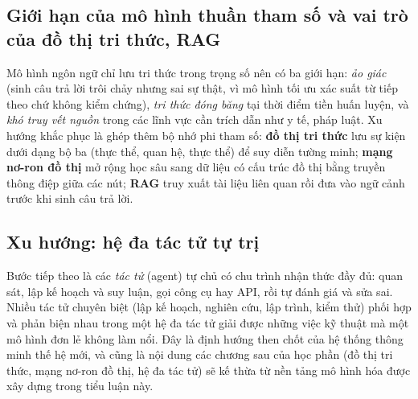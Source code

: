 
\subsection{Giới hạn của mô hình thuần tham số và vai trò của đồ thị tri thức, RAG}

Mô hình ngôn ngữ chỉ lưu tri thức trong trọng số nên có ba giới hạn: \emph{ảo giác} (sinh câu trả lời trôi chảy nhưng
sai sự thật, vì mô hình tối ưu xác suất từ tiếp theo chứ không kiểm chứng), \emph{tri thức đóng băng} tại thời điểm
tiền huấn luyện, và \emph{khó truy vết nguồn} trong các lĩnh vực cần trích dẫn như y tế, pháp luật. Xu hướng khắc phục
là ghép thêm bộ nhớ phi tham số: \textbf{đồ thị tri thức} lưu sự kiện dưới dạng bộ ba (thực thể, quan hệ, thực thể) để
suy diễn tường minh; \textbf{mạng nơ-ron đồ thị} mở rộng học sâu sang dữ liệu có cấu trúc đồ thị bằng truyền thông điệp
giữa các nút; \textbf{RAG} \cite{lewis2020} truy xuất tài liệu liên quan rồi đưa vào ngữ cảnh trước khi sinh câu trả lời.

\subsection{Xu hướng: hệ đa tác tử tự trị}

Bước tiếp theo là các \emph{tác tử} (agent) tự chủ có chu trình nhận thức đầy đủ: quan sát, lập kế hoạch và suy luận,
gọi công cụ hay API, rồi tự đánh giá và sửa sai. Nhiều tác tử chuyên biệt (lập kế hoạch, nghiên cứu, lập trình, kiểm thử)
phối hợp và phản biện nhau trong một hệ đa tác tử giải được những việc kỹ thuật mà một mô hình đơn lẻ không làm nổi.
Đây là định hướng then chốt của hệ thống thông minh thế hệ mới, và cũng là nội dung các chương sau của học phần
(đồ thị tri thức, mạng nơ-ron đồ thị, hệ đa tác tử) sẽ kế thừa từ nền tảng mô hình hóa được xây dựng trong tiểu luận này.
